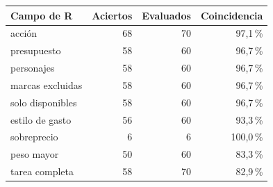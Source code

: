 \begin{tabular}{@{}lrrr@{}}\toprule
Campo de R & Aciertos & Evaluados & Coincidencia\\\midrule
acción & 68 & 70 & 97,1\,\%\\
presupuesto & 58 & 60 & 96,7\,\%\\
personajes & 58 & 60 & 96,7\,\%\\
marcas excluidas & 58 & 60 & 96,7\,\%\\
solo disponibles & 58 & 60 & 96,7\,\%\\
estilo de gasto & 56 & 60 & 93,3\,\%\\
sobreprecio & 6 & 6 & 100,0\,\%\\
peso mayor & 50 & 60 & 83,3\,\%\\
tarea completa & 58 & 70 & 82,9\,\%\\
\bottomrule\end{tabular}
